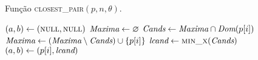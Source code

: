 \begin{algorithm}
    \caption[Algoritmo \textsc{closest\_pair} do par mais próximo]{Função \textsc{closest\_pair}$(p, n, \theta)$.}
    \label{alg:par-estatico:horizontal}
    \begin{algorithmic}[1]
            \State {} 
            \State $(a,b) \leftarrow (\textsc{null}, \textsc{null})$
            \State $\textit{Maxima} \leftarrow \varnothing$
                \State $\textit{Cands} \leftarrow \textit{Maxima}\cap \textit{Dom}(p[i])$
                \State $\textit{Maxima} \leftarrow (\textit{Maxima} \setminus \textit{Cands}) \cup \left\{ p[i]\right\}$
                \State $\lcand \leftarrow \Call{min\_x}{\Cands}$
                    \State $(a, b) \leftarrow (p[i], \textit{lcand})$
                \EndIf
            \EndFor
            \State {}
        \EndFunction
    \end{algorithmic}
\end{algorithm}